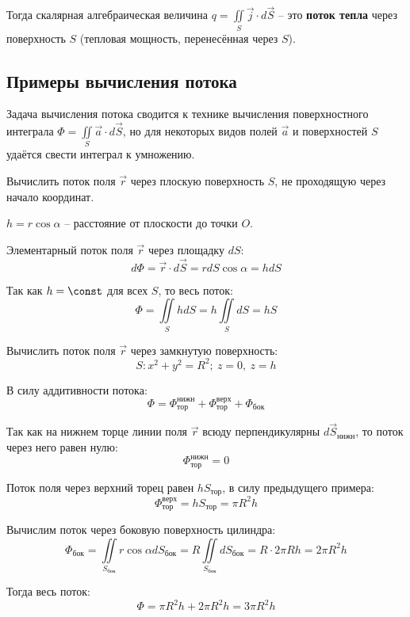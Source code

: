 	Тогда скалярная алгебраическая величина \( q = \iint\limits_S \vec{j}\cdot d\vec{S} \) -- это \textbf{поток тепла} через поверхность \( S \) (тепловая мощность, перенесённая через \( S \)).
	
\subsection{Примеры вычисления потока}

	Задача вычисления потока сводится к технике вычисления поверхностного интеграла \( \Phi = \iint\limits_S \vec{a}\cdot d\vec{S} \), но для некоторых видов полей \( \vec{a} \) и поверхностей \( S \) удаётся свести интеграл к умножению.
	
	\begin{example}
	Вычислить поток поля \( \vec{r} \) через плоскую поверхность \( S \), не проходящую через начало координат.
	\end{example}
	
	\begin{solution}
	\( h = r\cos\alpha \) -- расстояние от плоскости до точки \( O \).
	
	Элементарный поток поля \( \vec{r} \) через площадку \( dS \):
	\[ d\Phi = \vec{r}\cdot d\vec{S} = rdS\cos\alpha = hdS \]
	
	Так как \( h = \const \) для всех \( S \), то весь поток:
	\[ \Phi = \iint\limits_S hdS = h\iint\limits_S dS = hS \]
	\end{solution}
	
	\begin{example}
	Вычислить поток поля \( \vec{r} \) через замкнутую поверхность:
	\[ S: x^2 + y^2 = R^2; \ z = 0, \ z = h \]
	\end{example}
	
	\begin{solution}
	В силу аддитивности потока:
	\[ \Phi = \Phi^{\text{нижн}}_{\text{тор}} + \Phi^{\text{верх}}_{\text{тор}} + \Phi_{\text{бок}} \]
	
	Так как на нижнем торце линии поля \( \vec{r} \) всюду перпендикулярны \( d\vec{S}_{\text{нижн}} \), то поток через него равен нулю:
	\[ \Phi^{\text{нижн}}_{\text{тор}} = 0 \]
	
	Поток поля через верхний торец равен \( hS_{\text{тор}} \), в силу предыдущего примера:
	\[ \Phi^{\text{верх}}_{\text{тор}} = hS_{\text{тор}} = \pi R^2h\]
	
	Вычислим поток через боковую поверхность цилиндра:
	\[ \Phi_{\text{бок}} = \iint\limits_{S_{\text{бок}}} r\cos\alpha dS_{\text{бок}} = R\iint\limits_{S_{\text{бок}}} dS_{\text{бок}} = R\cdot 2\pi Rh = 2\pi R^2 h \]
	
	Тогда весь поток:
	\[ \Phi = \pi R^2h + 2\pi R^2h = 3\pi R^2h \]
	\end{solution}
	

